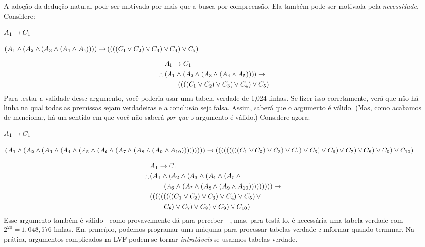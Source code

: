 A adoção da dedução natural pode ser motivada por mais que a busca por compreensão. Ela também pode ser motivada pela \emph{necessidade}. Considere:
\ifHTMLtarget
\begin{earg}
	\item $A_1 \rightarrow C_1$
	\item[\texttherefore] $(A_1 \wedge (A_2 \wedge (A_3 \wedge (A_4 \wedge A_5)))) \rightarrow 
	((((C_1 \vee C_2) \vee C_3) \vee C_4) \vee C_5)$
\end{earg}
\else
\begin{align*}
	& A_1 \eif C_1 \\
	\therefore\, & (A_1 \eand (A_2 \eand (A_3 \eand (A_4 \eand A_5)))) \eif {}\\ 
	& \qquad ((((C_1 \eor C_2) \eor C_3) \eor C_4) \eor C_5)
\end{align*}
\fi
Para testar a validade desse argumento, você poderia usar uma tabela-verdade de 1{,}024 linhas. Se fizer isso corretamente, verá que não há linha na qual todas as premissas sejam verdadeiras e a conclusão seja falsa. Assim, saberá que o argumento é válido. (Mas, como acabamos de mencionar, há um sentido em que você não saberá \emph{por que} o argumento é válido.) Considere agora:
\ifHTMLtarget
\begin{earg}
\item $A_1 \rightarrow C_1$
\item[\texttherefore] $(A_1 \wedge (A_2 \wedge (A_3 \wedge (A_4 \wedge (A_5 \wedge 
 (A_6 \wedge (A_7 \wedge (A_8 \wedge (A_9 \wedge A_{10}))))))))) \rightarrow 
 (((((((((C_1 \vee C_2) \vee C_3) \vee C_4) \vee C_5) \vee  C_6) \vee
 C_7) \vee C_8) \vee C_9) \vee C_{10})$
\end{earg}
\else
\begin{align*}
& A_1 \eif C_1 \\
\therefore\, & \small (A_1 \eand (A_2 \eand (A_3 \eand (A_4 \eand (A_5 \eand {}\\
&\qquad (A_6 \eand (A_7 \eand (A_8 \eand (A_9 \eand A_{10}))))))))) \eif {}\\
&(((((((((C_1 \eor C_2) \eor C_3) \eor C_4) \eor C_5) \eor {}\\
& \qquad C_6) \eor C_7) \eor C_8) \eor C_9) \eor C_{10})
\end{align*}
\fi
Esse argumento também é válido---como provavelmente dá para perceber---, mas, para testá-lo, é necessária uma tabela-verdade com $2^{20} = 1{,}048{,}576$ linhas. Em princípio, podemos programar uma máquina para processar tabelas-verdade e informar quando terminar. Na prática, argumentos complicados na LVF podem se tornar \emph{intratáveis} se usarmos tabelas-verdade.

